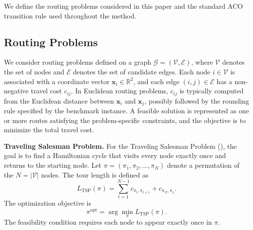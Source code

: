 
We define the routing problems considered in this paper and the standard ACO transition rule used throughout the method.

\subsection{Routing Problems}
\label{subsec:prelim_problem}

We consider routing problems defined on a graph $\mathcal{G}=(\mathcal{V},\mathcal{E})$, where $\mathcal{V}$ denotes the set of nodes and $\mathcal{E}$ denotes the set of candidate edges. Each node $i\in\mathcal{V}$ is associated with a coordinate vector $\mathbf{x}_i\in\mathbb{R}^2$, and each edge $(i,j)\in\mathcal{E}$ has a non-negative travel cost $c_{ij}$. In Euclidean routing problems, $c_{ij}$ is typically computed from the Euclidean distance between $\mathbf{x}_i$ and $\mathbf{x}_j$, possibly followed by the rounding rule specified by the benchmark instance. A feasible solution is represented as one or more routes satisfying the problem-specific constraints, and the objective is to minimize the total travel cost.

\noindent\textbf{Traveling Salesman Problem.}
For the Traveling Salesman Problem (\TSP{}), the goal is to find a Hamiltonian cycle that visits every node exactly once and returns to the starting node. Let $\pi=(\pi_1,\pi_2,\ldots,\pi_N)$ denote a permutation of the $N=|\mathcal{V}|$ nodes. The tour length is defined as
\begin{equation} L_{\mathrm{TSP}}(\pi) = \sum_{t=1}^{N-1} c_{\pi_t,\pi_{t+1}} + c_{\pi_N,\pi_1}. \end{equation}
The optimization objective is
\begin{equation} \pi^{\mathrm{opt}} = \arg\min_{\pi} L_{\mathrm{TSP}}(\pi). \end{equation}
The feasibility condition requires each node to appear exactly once in $\pi$.


